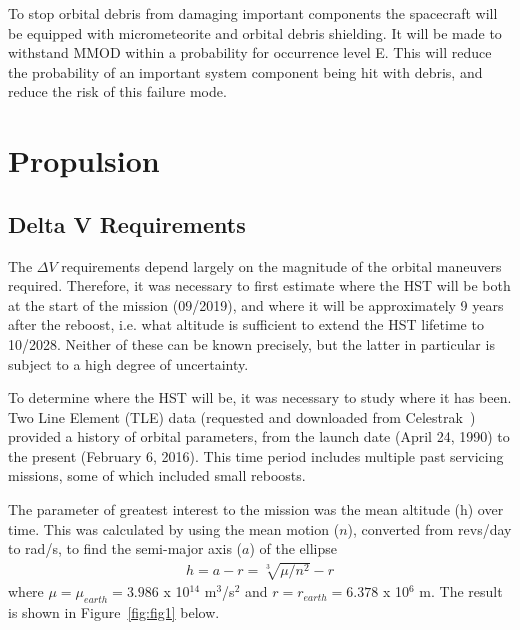 \documentclass[paper=letter, fontsize=11pt]{scrartcl} %
\numberwithin{equation}{section} %
\numberwithin{figure}{section} %
\numberwithin{table}{section} %
\begin{document}
To stop orbital debris from damaging important components the spacecraft will be equipped with micrometeorite and orbital debris shielding. It will be made to withstand MMOD within a probability for occurrence level E. This will reduce the probability of an important system component being hit with debris, and reduce the risk of this failure mode.


\section{Propulsion}

\subsection{Delta V Requirements}
The $\Delta V$ requirements depend largely on the magnitude of the orbital maneuvers required. Therefore, it was necessary to first estimate where the HST will be both at the start of the mission (09/2019), and where it will be approximately 9 years after the reboost, i.e. what altitude is sufficient to extend the HST lifetime to 10/2028. Neither of these can be known precisely, but the latter in particular is subject to a high degree of uncertainty.

To determine where the HST will be, it was necessary to study where it has been. Two Line Element (TLE) data (requested and downloaded from Celestrak~\cite{celestrak}) provided a history of orbital parameters, from the launch date (April 24, 1990) to the present (February 6, 2016). This time period includes multiple past servicing missions, some of which included small reboosts.

The parameter of greatest interest to the mission was the mean altitude (h) over time. This was calculated by using the mean motion ($n$), converted from revs/day to rad/s, to find the semi-major axis ($a$) of the ellipse
\begin{align*}
h = a - r = \sqrt[3]{\mu/n^2} - r
\end{align*}
where $\mu = \mu_{earth} = 3.986$ x 10$^14$ m$^3$/s$^2$ and $r = r_{earth} = 6.378$ x 10$^6$ m. The result is shown in Figure~\ref{fig:fig1} below.
\end{document}
